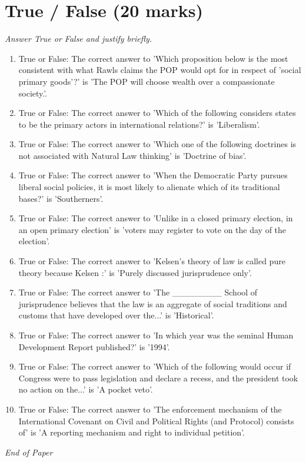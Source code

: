 \documentclass[12pt]{article}
\begin{document}
\section*{True / False (20 marks)}
\textit{Answer True or False and justify briefly.}
\begin{enumerate}[label=\arabic*.]
\item True or False: The correct answer to 'Which proposition below is the most consistent with what Rawls claims the POP would opt for in respect of 'social primary goods'?' is 'The POP will choose wealth over a compassionate society.'.
\item True or False: The correct answer to 'Which of the following considers states to be the primary actors in international relations?' is 'Liberalism'.
\item True or False: The correct answer to 'Which one of the following doctrines is not associated with Natural Law thinking' is 'Doctrine of bias'.
\item True or False: The correct answer to 'When the Democratic Party pursues liberal social policies, it is most likely to alienate which of its traditional bases?' is 'Southerners'.
\item True or False: The correct answer to 'Unlike in a closed primary election, in an open primary election' is 'voters may register to vote on the day of the election'.
\item True or False: The correct answer to 'Kelsen's theory of law is called pure theory because Kelsen :' is 'Purely discussed jurisprudence only'.
\item True or False: The correct answer to 'The \_\_\_\_\_\_\_\_ School of jurisprudence believes that the law is an aggregate of social traditions and customs that have developed over the...' is 'Historical'.
\item True or False: The correct answer to 'In which year was the seminal Human Development Report published?' is '1994'.
\item True or False: The correct answer to 'Which of the following would occur if Congress were to pass legislation and declare a recess, and the president took no action on the...' is 'A pocket veto'.
\item True or False: The correct answer to 'The enforcement mechanism of the International Covenant on Civil and Political Rights (and Protocol) consists of' is 'A reporting mechanism and right to individual petition'.
\end{enumerate}

\vfill
\noindent\textit{End of Paper}
\end{document}
